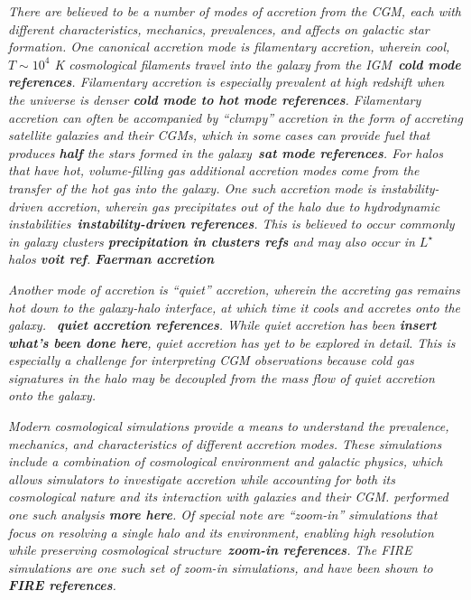 \documentclass[fleqn,usenatbib]{mnras}
\begin{document}
\textit{
There are believed to be a number of modes of accretion from the CGM, each with different characteristics, mechanics, prevalences, and affects on galactic star formation.
One canonical accretion mode is filamentary accretion, wherein cool, $T \sim 10^4$ K cosmological filaments travel into the galaxy  from the IGM~\textbf{cold mode references}.
Filamentary accretion is especially prevalent at high redshift when the universe is denser \textbf{cold mode to hot mode references}.
Filamentary accretion can often be accompanied by ``clumpy'' accretion in the form of accreting satellite galaxies and their CGMs, which in some cases can provide fuel that produces \textbf{half} the stars formed in the galaxy~\textbf{sat mode references}.
For halos that have hot, volume-filling gas additional accretion modes come from the transfer of the hot gas into the galaxy.
One such accretion mode is instability-driven accretion, wherein gas precipitates out of the halo due to hydrodynamic instabilities~\textbf{instability-driven references}.
This is believed to occur commonly in galaxy clusters \textbf{precipitation in clusters refs} and may also occur in $L^\star$ halos \textbf{voit ref}.
\textbf{Faerman accretion}
}

\textit{
Another mode of accretion is ``quiet'' accretion, wherein the accreting gas remains hot down to the galaxy-halo interface, at which time it cools and accretes onto the galaxy.
~\textbf{quiet accretion references}. 
While quiet accretion has been \textbf{insert what's been done here}, quiet accretion has yet to be explored in detail.
This is especially a challenge for interpreting CGM observations because cold gas signatures in the halo may be decoupled from the mass flow of quiet accretion onto the galaxy.
}

\textit{
Modern cosmological simulations provide a means to understand the prevalence, mechanics, and characteristics of different accretion modes.
These simulations include a combination of cosmological environment and galactic physics, which allows simulators to investigate accretion while accounting for both its cosmological nature and its interaction with galaxies and their CGM.
\cite{Ho2019} performed one such analysis \textbf{more here}.
Of special note are ``zoom-in'' simulations that focus on resolving a single halo and its environment, enabling high resolution while preserving cosmological structure~\textbf{zoom-in references}.
The FIRE simulations are one such set of zoom-in simulations, and have been shown to \textbf{FIRE references}.
}
\end{document}
